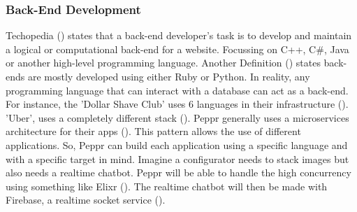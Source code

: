 \subsubsection{Back-End Development}
Techopedia (\cite{backendDevDefinition}) states that a back-end developer's task is to develop and maintain a logical or computational back-end for a website. Focussing on C++, C\#, Java or another high-level programming language. Another Definition (\cite{backendDevDefinition}) states back-ends are mostly developed using either Ruby or Python.
In reality, any programming language that can interact with a database can act as a back-end. For instance, the 'Dollar Shave Club' uses 6 languages in their infrastructure (\cite{dollarShaveClubBackEnd}). 'Uber', uses a completely different stack (\cite{uberBackEnd}).
Peppr generally uses a microservices architecture for their apps (\cite{microservices}). This pattern allows the use of different applications. So, Peppr can build each application using a specific language and with a specific target in mind. Imagine a configurator needs to stack images but also needs a realtime chatbot. Peppr will be able to handle the high concurrency using something like Elixr (\cite{elixr}). The realtime chatbot will then be made with Firebase, a realtime socket service (\cite{firebase}).

